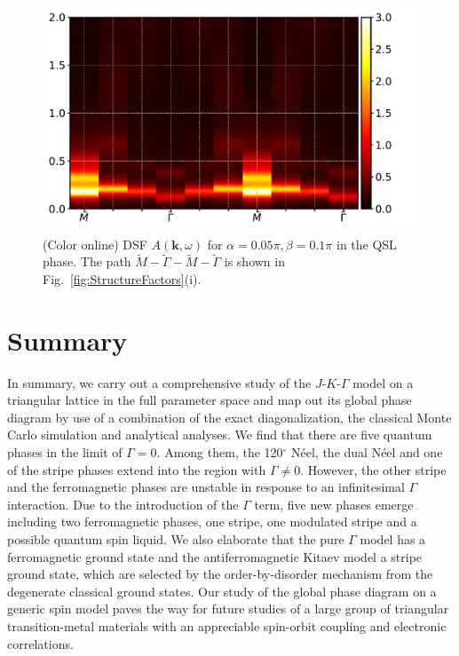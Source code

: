 \documentclass[aps,prb,reprint,amsfonts,amsmath,amssymb,showpacs,groupedaddress,superscriptaddress]{revtex4-1}
\begin{document}
\begin{figure}
    \centering
    \includegraphics[width=\columnwidth]{Spectrum.pdf}
    \caption{\label{fig:Spectrum}(Color online) DSF $A(\bm{k}, \omega)$ for $\alpha=0.05\pi,\beta=0.1\pi$ in the QSL phase. The path $\tilde{M}-\tilde{\Gamma}-\tilde{M}-\tilde{\Gamma}$ is shown in Fig.~\ref{fig:StructureFactors}(i).}
\end{figure}


\section{\label{sec:Summary}Summary}

In summary, we carry out a comprehensive study of the $J$-$K$-$\Gamma$ model on a triangular lattice in the full parameter space and map out its global phase diagram by use of a combination of the exact diagonalization, the classical Monte Carlo simulation and analytical analyses. We find that there are five quantum phases in the limit of $\Gamma=0$.
Among them, the 120$^\circ$ N\'{e}el, the dual N\'{e}el and one of the stripe phases extend into the region with $\Gamma\ne 0$. However, the other stripe and the ferromagnetic phases are unstable in response to an infinitesimal $\Gamma$ interaction. Due to the introduction of the $\Gamma$ term, five new phases emerge including two ferromagnetic phases, one stripe, one modulated stripe and a possible quantum spin liquid. We also elaborate that the pure $\Gamma$ model has a ferromagnetic ground state and the antiferromagnetic Kitaev model a stripe ground state, which are selected by the order-by-disorder mechanism from the degenerate classical ground states.
Our study of the global phase diagram on a generic spin model paves the way for future studies of a large group of triangular transition-metal materials with an appreciable spin-orbit coupling and electronic correlations.
\end{document}
